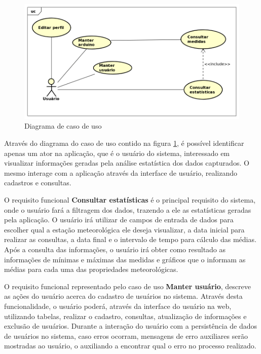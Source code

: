 \begin{figure}[H]
    \centering
    \caption{Diagrama de caso de uso} \label{fig:figure_diagrama_caso_uso}
    \includegraphics[scale=0.45]{diagrams/caso_de_uso.png}
    \hfill
{}
\end{figure}

Através do diagrama do caso de uso contido na figura \ref{fig:figure_diagrama_caso_uso}, é possível identificar apenas um ator na aplicação, que é o usuário do sistema, interessado em visualizar informações geradas pela análise estatística dos dados capturados. O mesmo interage com a aplicação através da interface de usuário, realizando cadastros e consultas.

O requisito funcional \textbf{Consultar estatísticas} é o principal requisito do sistema, onde o usuário fará a filtragem dos dados, trazendo a ele as estatísticas geradas pela aplicação.
O usuário irá utilizar de campos de entrada de dados para escolher qual a estação meteorológica ele deseja visualizar, a data inicial para realizar as consultas, a data final e o intervalo de tempo para cálculo das médias.
Após a consulta das informações, o usuário irá obter como resultado as informações de mínimas e máximas das medidas e gráficos que o informam as médias para cada uma das propriedades meteorológicas.

O requisito funcional representado pelo caso de uso \textbf{Manter usuário}, descreve as ações do usuário acerca do cadastro de usuários no sistema.
Através desta funcionalidade, o usuário poderá, através da interface do usuário na web, utilizando tabelas, realizar o cadastro, consultas, atualização de informações e exclusão de usuários.
Durante a interação do usuário com a persistência de dados de usuários no sistema, caso erros ocorram, mensagens de erro auxiliares serão mostradas ao usuário, o auxiliando a encontrar qual o erro no processo realizado.

